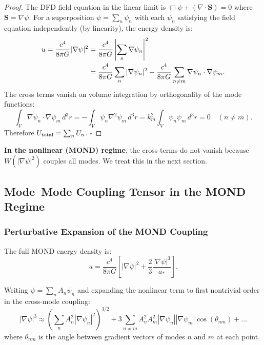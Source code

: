 \documentclass[aps,prd,twocolumn,superscriptaddress]{revtex4-2}
\newcommand{\astar}{a_*}
\begin{document}
\begin{proof}
The DFD field equation in the linear limit is
$\Box\psi + (\nabla\cdot\mathbf{S}) = 0$ where $\mathbf{S} = \nabla\psi$.
For a superposition $\psi = \sum_n \psi_n$ with each $\psi_n$ satisfying
the field equation independently (by linearity), the energy density is:
\begin{align}
u = \frac{c^4}{8\pi G}|\nabla\psi|^2
&= \frac{c^4}{8\pi G}\left|\sum_n\nabla\psi_n\right|^2 \notag\\
&= \frac{c^4}{8\pi G}\sum_n|\nabla\psi_n|^2
+ \frac{c^4}{8\pi G}\sum_{n\neq m}\nabla\psi_n\cdot\nabla\psi_m.
\end{align}
The cross terms vanish on volume integration by orthogonality of
the mode functions:
\begin{equation}
\int_V \nabla\psi_n\cdot\nabla\psi_m\,d^3r
= -\int_V \psi_n\nabla^2\psi_m\,d^3r
= k_m^2\int_V\psi_n\psi_m\,d^3r = 0 \quad (n\neq m).
\end{equation}
Therefore $U_{\rm total} = \sum_n U_n$. $\square$
\end{proof}

\textbf{In the nonlinear (MOND) regime}, the cross terms do not vanish
because $W(|\nabla\psi|^2)$ couples all modes.  We treat this in the
next section.

\subsection{Mode--Mode Coupling Tensor in the MOND Regime}

\subsubsection{Perturbative Expansion of the MOND Coupling}

The full MOND energy density is:
\begin{equation}
u = \frac{c^4}{8\pi G}\left[
|\nabla\psi|^2 + \frac{2}{3}\frac{|\nabla\psi|^3}{\astar}
\right].
\end{equation}

Writing $\psi = \sum_n A_n\psi_n$ and expanding the nonlinear term
to first nontrivial order in the cross-mode coupling:
\begin{equation}
|\nabla\psi|^3 \approx \left(\sum_n A_n^2|\nabla\psi_n|^2\right)^{3/2}
+ 3\sum_{n\neq m}A_n^2 A_m^2 |\nabla\psi_n||\nabla\psi_m|
\cos(\theta_{nm}) + \ldots
\end{equation}
where $\theta_{nm}$ is the angle between gradient vectors of modes
$n$ and $m$ at each point.
\end{document}
